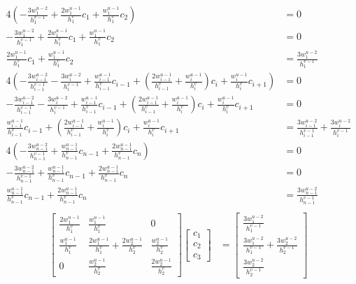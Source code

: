 \documentclass{article}
\begin{document}
\begin{align*}
  4\left(-\frac{3w_1^{u-2}}{h_1^{v-1}}+\frac{2w_1^{u-1}}{h_1^v}c_1+\frac{w_1^{u-1}}{h_1^v}c_2\right)
  &= 0 \\
  -\frac{3w_1^{u-2}}{h_1^{v-1}}+\frac{2w_1^{u-1}}{h_1^v}c_1+\frac{w_1^{u-1}}{h_1^v}c_2
  &= 0 \\
  \frac{2w_1^{u-1}}{h_1^v}c_1+\frac{w_1^{u-1}}{h_1^v}c_2
  &= \frac{3w_1^{u-2}}{h_1^{v-1}} \\
  4\left(
  -\frac{3w_{i-1}^{u-2}}{h_{i-1}^{v-1}}-\frac{3w_i^{u-2}}{h_i^{v-1}}
  +\frac{w_{i-1}^{u-1}}{h_{i-1}^v}c_{i-1}
  +\left(\frac{2w_{i-1}^{u-1}}{h_{i-1}^v}+\frac{w_i^{u-1}}{h_i^v}\right)c_i
  +\frac{w_i^{u-1}}{h_i^v}c_{i+1}
  \right)
  &= 0 \\
  -\frac{3w_{i-1}^{u-2}}{h_{i-1}^{v-1}}-\frac{3w_i^{u-2}}{h_i^{v-1}}
  +\frac{w_{i-1}^{u-1}}{h_{i-1}^v}c_{i-1}
  +\left(\frac{2w_{i-1}^{u-1}}{h_{i-1}^v}+\frac{w_i^{u-1}}{h_i^v}\right)c_i
  +\frac{w_i^{u-1}}{h_i^v}c_{i+1}
  &= 0 \\
  \frac{w_{i-1}^{u-1}}{h_{i-1}^v}c_{i-1}
  +\left(\frac{2w_{i-1}^{u-1}}{h_{i-1}^v}+\frac{w_i^{u-1}}{h_i^v}\right)c_i
  +\frac{w_i^{u-1}}{h_i^v}c_{i+1}
  &= \frac{3w_{i-1}^{u-2}}{h_{i-1}^{v-1}}+\frac{3w_i^{u-2}}{h_i^{v-1}} \\
  4\left(-\frac{3w_{n-1}^{u-2}}{h_{n-1}^{v-1}}+\frac{w_{n-1}^{u-1}}{h_{n-1}^v}c_{n-1}+\frac{2w_{n-1}^{u-1}}{h_{n-1}^v}c_n\right)
  &= 0 \\
  -\frac{3w_{n-1}^{u-2}}{h_{n-1}^{v-1}}+\frac{w_{n-1}^{u-1}}{h_{n-1}^v}c_{n-1}+\frac{2w_{n-1}^{u-1}}{h_{n-1}^v}c_n
  &= 0 \\
  \frac{w_{n-1}^{u-1}}{h_{n-1}^v}c_{n-1}+\frac{2w_{n-1}^{u-1}}{h_{n-1}^v}c_n
  &= \frac{3w_{n-1}^{u-2}}{h_{n-1}^{v-1}} \\
\end{align*}
\begin{align*}
  \begin{bmatrix}
    \frac{2w_1^{u-1}}{h_1^v} & \frac{w_1^{u-1}}{h_1^v} & 0 \\
    \frac{w_1^{u-1}}{h_1^v} & \frac{2w_1^{u-1}}{h_1^v}+\frac{2w_2^{u-1}}{h_2^v} & \frac{w_2^{u-1}}{h_2^v} \\
    0 & \frac{w_2^{u-1}}{h_2^v} & \frac{2w_2^{u-1}}{h_2^v}
  \end{bmatrix}
  \begin{bmatrix}
    c_1 \\ c_2 \\ c_3
  \end{bmatrix}
  &= 
  \begin{bmatrix}
    \frac{3w_1^{u-2}}{h_1^{v-1}} \\
    \frac{3w_1^{u-2}}{h_1^{v-1}}+\frac{3w_2^{u-2}}{h_2^{v-1}} \\
    \frac{3w_2^{u-2}}{h_2^{v-1}}
  \end{bmatrix}
\end{align*}
\end{document}
